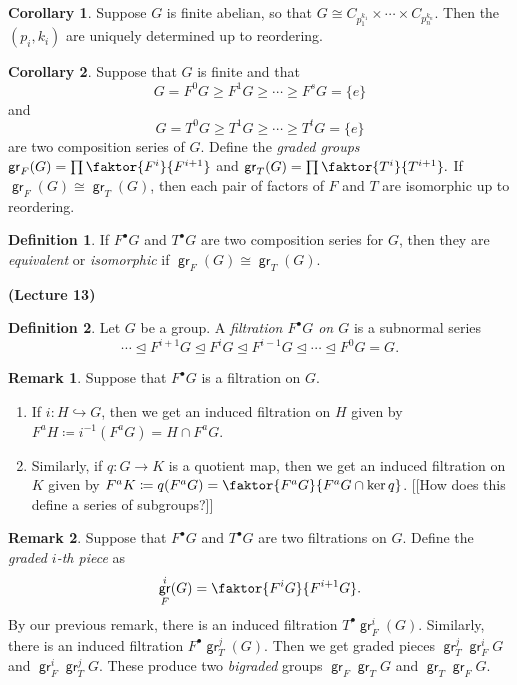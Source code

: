 \documentclass[10pt,letterpaper,cm]{nupset}
\theoremstyle{definition}
\newtheorem*{definition}{Definition}
\newtheorem{remark}{Remark}
\newtheorem{corollary}{Corollary}
\newcommand{\1}{\mathbf{1}}
\newcommand{\0}{\vec 0}
\DeclareMathOperator{\gr}{\mathsf{gr}}
\begin{document}
\begin{corollary}
Suppose $G$ is finite abelian, so that $G \cong C_{p_1^{k_1}} \times \cdots \times C_{p_n^{k_n}}$. Then the $(p_i, k_i)$ are uniquely determined up to reordering.
\end{corollary}

\begin{corollary}
Suppose that $G$ is finite and that $$ G = F^0G \geq F^1G \geq \cdots \geq F^sG = \{e\}  $$ and $$G = T^0G \geq T^1G \geq \cdots \geq T^tG = \{e\}$$ are two composition series of $G$. Define the \textit{graded groups} $\gr_F(G) = \prod \faktor{F^i}{F^{i+1}}$ and $\gr_T(G) = \prod \faktor{T^i}{T^{i+1}}.$ If $\gr_F(G) \cong \gr_T(G)$, then each pair of factors of $F$ and $T$ are isomorphic up to reordering. 
\end{corollary}

\begin{definition}
If $F^{\bullet}G$ and $T^{\bullet}G$ are two composition series for $G$, then they are \textit{equivalent} or \textit{isomorphic} if $\gr_F(G) \cong \gr_T(G)$.
\end{definition}

\begin{center}
{\textbf{(Lecture 13)}} 
\end{center}

\begin{definition}
Let $G$ be a group. A \textit{filtration $F^{\bullet}{G}$ on $G$} is a subnormal series
\[
\cdots \unlhd F^{i+1}{G} \unlhd F^i{G} \unlhd F^{i-1}{G} \unlhd \cdots \unlhd F^0{G} = G
.\]
\end{definition}

\begin{remark} Suppose that $F^{\bullet}G$ is a filtration on $G$.
\begin{enumerate}
\item If $i : H \hookrightarrow G$, then we get an induced filtration on $H$ given by $F^a{H}\coloneqq  i^{-1}(F^aG) = H \cap F^a{G}$.
\item Similarly, if $q: G \to K$ is a quotient map, then we get an induced filtration on $K$ given by $F^aK\coloneqq  q(F^aG) = \faktor{F^aG}{F^aG \cap \ker q}$. {[[How does this define a series of subgroups?]]}
\end{enumerate}
\end{remark}

\begin{remark}
Suppose that $F^{\bullet}G$ and $T^{\bullet}G$ are two filtrations on $G$. Define the \textit{graded $i$-th piece} as $$\gr_F^i(G) = \faktor{F^iG}{F^{i+1}G}.$$ By our previous remark, there is an induced filtration $T^{\bullet}\gr_F^i(G)$. Similarly, there is an induced filtration $F^{\bullet}\gr_T^j(G)$. Then we get graded pieces $\gr_T^j\gr_F^iG$ and $\gr_F^i \gr_T^j G$. These produce two \textit{bigraded} groups $\gr_F\gr_TG$ and $\gr_T\gr_FG$.
\end{remark}
\end{document}
